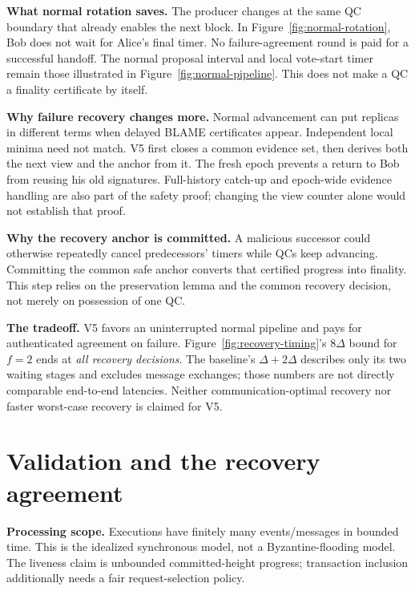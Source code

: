 \documentclass[10pt,a4paper]{article}
\begin{document}
\textbf{What normal rotation saves.} The producer changes at the same QC
boundary that already enables the next block. In Figure~\ref{fig:normal-rotation},
Bob does not wait for Alice's final timer. No failure-agreement round is
paid for a successful handoff. The normal proposal interval and local
vote-start timer remain those illustrated in Figure~\ref{fig:normal-pipeline}.
This does not make a QC a finality certificate by itself.

\textbf{Why failure recovery changes more.} Normal advancement can put
replicas in different terms when delayed BLAME certificates appear.
Independent local minima need not match. V5 first closes a common evidence
set, then derives both the next view and the anchor from it. The fresh epoch
prevents a return to Bob from reusing his old signatures. Full-history
catch-up and epoch-wide evidence handling are also part of the safety proof;
changing the view counter alone would not establish that proof.

\textbf{Why the recovery anchor is committed.} A malicious successor could
otherwise repeatedly cancel predecessors' timers while QCs keep advancing.
Committing the common safe anchor converts that certified progress into
finality. This step relies on the preservation lemma and the common recovery
decision, not merely on possession of one QC.

\textbf{The tradeoff.} V5 favors an uninterrupted normal pipeline and pays
for authenticated agreement on failure. Figure~\ref{fig:recovery-timing}'s
$8\Delta$ bound for $f=2$ ends at \emph{all recovery decisions}. The baseline's
$\Delta+2\Delta$ describes only its two waiting stages and excludes message
exchanges; those numbers are not directly comparable end-to-end latencies.
Neither communication-optimal recovery nor faster worst-case recovery is
claimed for V5.

\clearpage
\section*{Validation and the recovery agreement}\label{sec:agreement}
\textbf{Processing scope.} Executions have finitely many events/messages
in bounded time. This is the idealized synchronous model, not a
Byzantine-flooding model. The liveness claim is unbounded committed-height
progress; transaction inclusion additionally needs a fair request-selection
policy.
\end{document}
